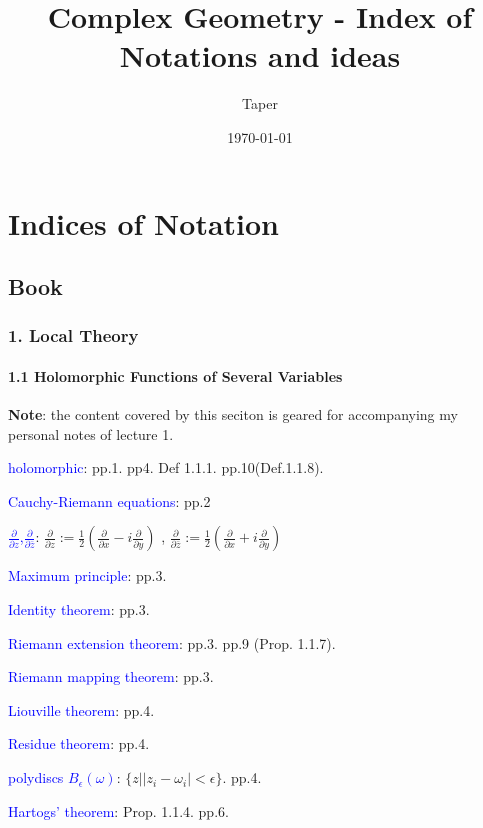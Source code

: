 \documentclass{book}
\title{Complex Geometry - Index of Notations and ideas}
\date{\today}
\author{Taper}
\numberwithin{equation}{subsection} %
\theoremstyle{definition}
\begin{document}
\maketitle
\tableofcontents

\part{Indices of Notation}

\chapter{Book}
\section{1. Local Theory}
    \subsection{1.1 Holomorphic Functions of Several Variables}
    \label{sec:1.1_book}
    \textbf{Note}: the content covered by this seciton is geared for accompanying my personal notes of lecture 1.
    
    \textcolor{blue}{holomorphic}: pp.1. pp4. Def 1.1.1. pp.10(Def.1.1.8).
    
    \textcolor{blue}{Cauchy-Riemann equations}: pp.2
    
    \textcolor{blue}{$\frac{\partial}{\partial z}$,$\frac{\partial}{\partial \bar{z}}$}:
    $\frac{\partial}{\partial z}:= \frac{1}{2}
            (\frac{\partial}{\partial x} 
            -i \frac{\partial}{\partial y})
            $
    ,
    $\frac{\partial}{\partial \bar{z}}:= \frac{1}{2}
    (\frac{\partial}{\partial x} 
    + i \frac{\partial}{\partial y})
    $
    
    
    \textcolor{blue}{Maximum principle}: pp.3.
    
    \textcolor{blue}{Identity theorem}: pp.3.
    
    \textcolor{blue}{Riemann extension theorem}: pp.3. pp.9 (Prop. 1.1.7).
    
    \textcolor{blue}{Riemann mapping theorem}: pp.3.
    
    \textcolor{blue}{Liouville theorem}: pp.4.
    
    \textcolor{blue}{Residue theorem}: pp.4.
    
    \textcolor{blue}{polydiscs $B_\epsilon(\omega)$}: $\{z| |z_i-\omega_i| <\epsilon\} $.  pp.4.
    
    \textcolor{blue}{Hartogs' theorem}: Prop. 1.1.4. pp.6.
    
\end{document}
